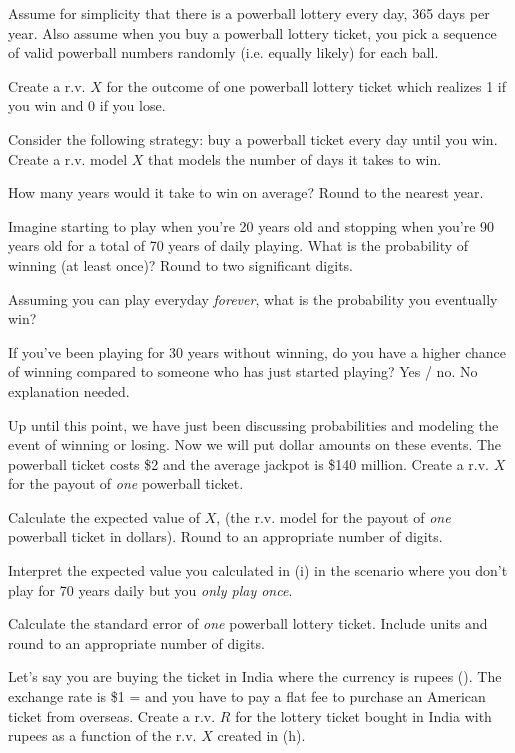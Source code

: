 \documentclass[12pt]{article}
\begin{document}
Assume for simplicity that there is a powerball lottery every day, 365 days per year. Also assume when you buy a powerball lottery ticket, you pick a sequence of valid powerball numbers randomly (i.e. equally likely) for each ball.

\benum
{} Create a r.v. $X$ for the outcome of one powerball lottery ticket which realizes 1 if you win and 0 if you lose. 


 Consider the following strategy: buy a powerball ticket every day until you win. Create a r.v. model $X$ that models the number of days it takes to win. 

 How many years would it take to win on average? Round to the nearest year. 

 Imagine starting to play when you're 20 years old and stopping when you're 90 years old for a total of 70 years of daily playing. What is the probability of winning (at least once)? Round to two significant digits. 


 Assuming you can play everyday \emph{forever}, what is the probability you eventually win? 

 If you've been playing for 30 years without winning, do you have a higher chance of winning compared to someone who has just started playing? Yes / no. No explanation needed. 

 Up until this point, we have just been discussing probabilities and modeling the event of winning or losing. Now we will put dollar amounts on these events. The powerball ticket costs \$2 and the average jackpot is \$140 million. Create a r.v. $X$ for the payout of \textit{one} powerball ticket. 

 Calculate the expected value of $X$, (the r.v. model for the payout of \emph{one} powerball ticket in dollars). Round to an appropriate number of digits. 

 Interpret the expected value you calculated in (i) in the scenario where you don't play for 70 years daily but you \textit{only play once}. 

 Calculate the standard error of \emph{one} powerball lottery ticket.  Include units and round to an appropriate number of digits. 


 Let's say you are buying the ticket in India where the currency is rupees (\rupee). The exchange rate is \$1 =  and you have to pay a flat  fee to purchase an American ticket from overseas. Create a r.v. $R$ for the lottery ticket bought in India with rupees as a function of the r.v. $X$ created in (h).
\end{document}
